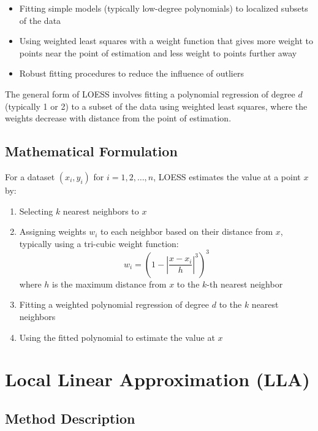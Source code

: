\documentclass{article}
\begin{document}
\begin{itemize}
    \item Fitting simple models (typically low-degree polynomials) to localized subsets of the data
    \item Using weighted least squares with a weight function that gives more weight to points near the point of estimation and less weight to points further away
    \item Robust fitting procedures to reduce the influence of outliers
\end{itemize}

The general form of LOESS involves fitting a polynomial regression of degree $d$ (typically 1 or 2) to a subset of the data using weighted least squares, where the weights decrease with distance from the point of estimation.

\subsection{Mathematical Formulation}

For a dataset $(x_i, y_i)$ for $i = 1, 2, \ldots, n$, LOESS estimates the value at a point $x$ by:

\begin{enumerate}
    \item Selecting $k$ nearest neighbors to $x$
    \item Assigning weights $w_i$ to each neighbor based on their distance from $x$, typically using a tri-cubic weight function:
    \begin{equation}
        w_i = \left(1 - \left|\frac{x - x_i}{h}\right|^3\right)^3
    \end{equation}
    where $h$ is the maximum distance from $x$ to the $k$-th nearest neighbor
    \item Fitting a weighted polynomial regression of degree $d$ to the $k$ nearest neighbors
    \item Using the fitted polynomial to estimate the value at $x$
\end{enumerate}

\section{Local Linear Approximation (LLA)}

\subsection{Method Description}
\end{document}

